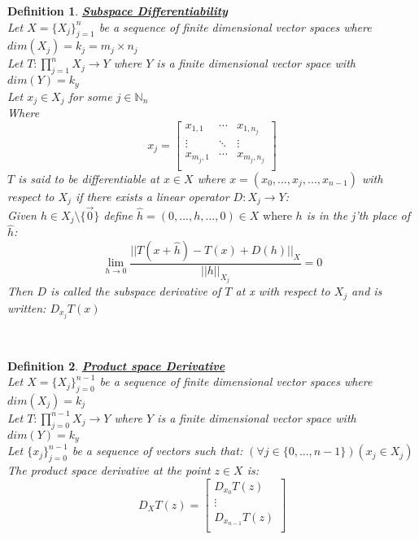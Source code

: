 \documentclass[12pt]{extarticle}
\theoremstyle{plain}
\theoremstyle{plain}
\theoremstyle{plain}
\theoremstyle{Definition}
\newtheorem{def.}{Definition}[section]
\theoremstyle{Definition}
\theoremstyle{plain}
\theoremstyle{plain}
\newcommand{\cut}[0]{\noindent\framebox[\linewidth]{\rule{\linewidth}{2pt}}\\}
\begin{document}
\begin{def.} \underline{\textbf{Subspace Differentiability}} \\ 
	Let $X = \{X_j\}_{j=1}^{n}$ be a sequence of finite dimensional vector spaces where $dim(X_j) = k_j = m_j \times n_j$ \\ 
	Let $T : \prod_{j=1}^{n} X_j \to Y$ where $Y$ is a finite dimensional vector space with $dim(Y) = k_y$ \\ 
	Let $x_j \in X_j$ for some $j \in \mathbb{N}_n$ \\ 
	Where 
	\[
	x_j = 
	\begin{bmatrix}
	x_{1,1} & \cdots & x_{1,n_j} \\ 
	\vdots & \ddots & \vdots \\
	x_{m_j,1} & \cdots & x_{m_j,n_j} \\ 	
	\end{bmatrix}
	\]
	$T$ is said to be differentiable at $x \in X$ where $x = (x_0,...,x_j,...,x_{n-1})$ with respect to $X_j$ if there exists a linear operator $D : X_j \to Y$: \\ 
	Given $h \in X_j \setminus \{\vec{0}\}$ define $\hat{h} = (0,...,h,...,0) \in X \text{ where } h$ is in the j'th place of $\hat{h}$: \\
	$$\lim_{h \to 0} \frac{||T(x + \hat{h}) - T(x) + D(h)||_{X}}{||h||_{X_j}} = 0$$
	Then $D$ is called the subspace derivative of $T$ at x with respect to $X_j$ and is written: $D_{x_j} T(x)$ \\ 
\end{def.}
\cut
\begin{def.} \underline{\textbf{Product space Derivative}} \\ 
		Let $X = \{X_j\}_{j=0}^{n-1}$ be a sequence of finite dimensional vector spaces where $dim(X_j) = k_j$ \\ 
		Let $T : \prod_{j=0}^{n-1} X_j \to Y$ where $Y$ is a finite dimensional vector space with $dim(Y) = k_y$ \\
		Let $\{x_j\}_{j=0}^{n-1}$ be a sequence of vectors such that: $(\forall j \in \{0,...,n-1\})(x_j \in X_j)$ \\ 
		The product space derivative at the point $z \in X$ is: \\ 
		\[
		D_{X} T(z) = 
		\begin{bmatrix}
		D_{x_0} T(z) \\ 
		\vdots \\ 
		D_{x_{n-1}} T(z) \\ 		
		\end{bmatrix}
		\]
\end{def.}
\end{document}
